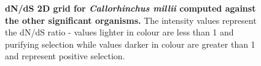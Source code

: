 \documentclass{article}
\begin{document}
\begin{figure}[H]
\centering
{}
\caption{\textbf{dN/dS 2D grid for \textit{Callorhinchus millii} computed against the other significant organisms.} The intensity values represent the dN/dS ratio - values lighter in colour are less than 1 and purifying selection while values darker in colour are greater than 1 and represent positive selection.}
\label{sup_fig_19}
\end{figure}
\end{document}
